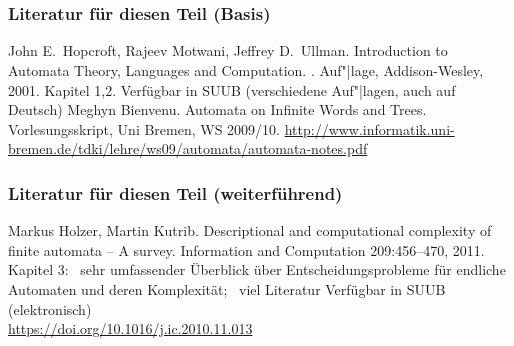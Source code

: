   \AtBeginSection{\relax}
  \section*{}
    \begin{frame}
      \frametitle{Literatur für diesen Teil (Basis)}
      \begin{small}
        \begin{thebibliography}{99}
            John E.\ Hopcroft, Rajeev Motwani, Jeffrey D.\ Ullman.
            \newblock
            Introduction to Automata Theory, Languages and Computation.
            . Auf"|lage, Addison-Wesley, 2001.
            \newblock
            Kapitel 1,2.
            \newblock
            Verfügbar in SUUB (verschiedene Auf"|lagen, auch auf Deutsch)
            Meghyn Bienvenu.
            \newblock
            Automata on Infinite Words and Trees.
            \newblock
            Vorlesungsskript, Uni Bremen, WS 2009/10.
            \newblock
            \url{http://www.informatik.uni-bremen.de/tdki/lehre/ws09/automata/automata-notes.pdf}
        \end{thebibliography}
        \par
      \end{small}
    \end{frame}

    \begin{frame}
      \frametitle{Literatur für diesen Teil (weiterführend)}
      \begin{small}
        \begin{thebibliography}{99}
          Markus Holzer, Martin Kutrib.
          \newblock
          Descriptional and computational complexity of finite automata – A survey.
          \newblock
          Information and Computation 209:456--470, 2011.
          \newblock
          Kapitel 3:~
          sehr umfassender Überblick über Entscheidungsprobleme für endliche Automaten
          und deren Komplexität;~ viel Literatur
          \newblock
          Verfügbar in SUUB (elektronisch) \\
          \url{https://doi.org/10.1016/j.ic.2010.11.013}
        \end{thebibliography}
        \par
      \end{small}
      \end{frame}

